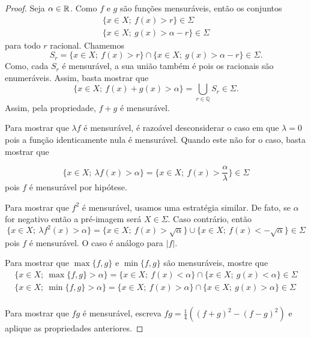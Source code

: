 \begin{proof}
    Seja $\alpha\in\mathbb{R}$. Como $f$ e $g$ são funções mensuráveis, então os conjuntos
    \begin{eqnarray*}
        \{x\in X; \ f(x)> r\}\in \Sigma\\
        \{x\in X; \ g(x)> \alpha-r\}\in \Sigma
    \end{eqnarray*}
    para todo $r$ racional. Chamemos
    \begin{equation*}
        S_r=\{x\in X; \ f(x)> r\}\cap \{x\in X; \ g(x)> \alpha-r\}\in\Sigma.
    \end{equation*}
    Como, cada $S_r$ é mensurável, a sua união também é pois os racionais são enumeráveis. Assim, basta mostrar que
    \begin{equation*}
        \{x\in X; \ f(x)+g(x)> \alpha\}= \bigcup_{r\in \mathbb{Q}} S_r\in\Sigma.
    \end{equation*}
    Assim, pela propriedade, $f+g$ é mensurável.

    Para mostrar que $\lambda f$ é mensurável, é razoável desconsiderar o caso em que $\lambda =0$ pois a função identicamente nula é mensurável. Quando este não for o caso, basta mostrar que

    \begin{equation*}
        \{x\in X; \ \lambda f(x)> \alpha\}= \{x\in X; \ f(x)> \frac{\alpha}{\lambda}\}\in \Sigma
    \end{equation*}
        pois $f$ é mensurável por hipótese.

        Para mostrar que $f^2$ é mensurável, usamos uma estratégia similar. De fato, se $\alpha$ for negativo então a pré-imagem será $X\in\Sigma$. Caso contrário, então 
        \begin{equation*}
        \{x\in X; \ \lambda f^2(x)> \alpha\}= \{x\in X; \ f(x)> \sqrt{\alpha}\}\cup\{x\in X; \ f(x)< -\sqrt{\alpha}\} \in \Sigma
    \end{equation*}
    pois $f$ é mensurável. O caso é análogo para $|f|$.

    Para mostrar que $\max\{f,g\}$ e $\min\{f,g\}$ são mensuráveis, mostre que
    \begin{eqnarray*}
        \{x\in X; \ \max\{f,g\}> \alpha\}= \{x\in X; \ f(x)< \alpha\}\cap\{x\in X; \ g(x)<\alpha\} \in \Sigma\\
        \{x\in X; \ \min\{f,g\}> \alpha\}= \{x\in X; \ f(x)> \alpha\}\cap\{x\in X; \ g(x)>\alpha\} \in \Sigma\\
    \end{eqnarray*}

    Para mostrar que $fg$ é mensurável, escreva $fg=\frac{1}{4}((f+g)^2-(f-g)^2)$ e aplique as propriedades anteriores.
\end{proof}